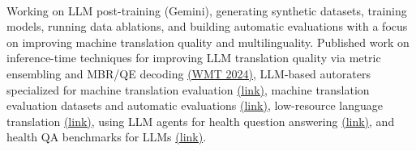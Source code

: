 
\\
Working on LLM post-training (Gemini), generating synthetic datasets, training models, running data ablations, and building automatic evaluations with a focus on improving machine translation quality and multilinguality.
Published work on inference-time techniques for improving LLM translation quality via metric ensembling and MBR/QE decoding \href{https://aclanthology.org/2024.wmt-1.109.pdf}{(WMT 2024)}, LLM-based autoraters specialized for machine translation evaluation \href{https://arxiv.org/pdf/2411.15387}{(link)}, machine translation evaluation datasets and automatic evaluations \href{https://arxiv.org/pdf/2502.12404}{(link)}, low-resource language translation \href{https://arxiv.org/pdf/2502.12301}{(link)}, using LLM agents for health question answering \href{https://arxiv.org/pdf/2406.06464}{(link)}, and health QA benchmarks for LLMs \href{https://arxiv.org/pdf/2305.15525}{(link)}.\\

\vspace{-1mm}

